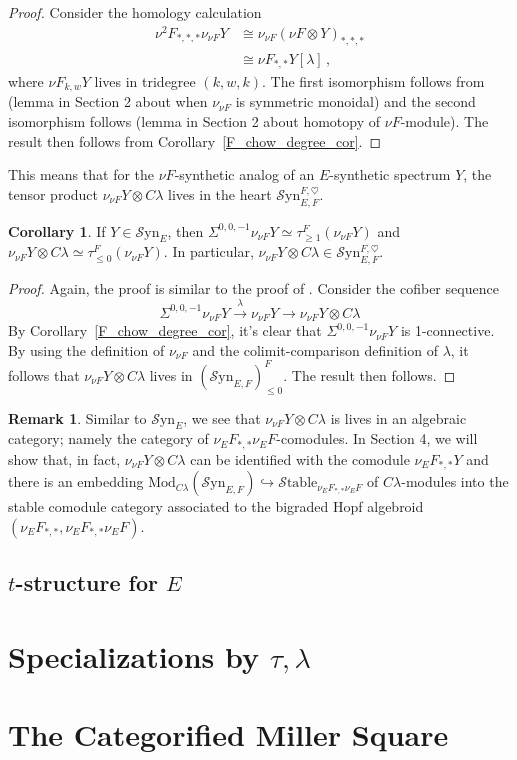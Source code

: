 \documentclass[10pt]{amsart}
\theoremstyle{definition}
\numberwithin{figure}{section}
\numberwithin{equation}{section}
\newtheorem{corollary}[figure]{Corollary}
\newtheorem{remark}[figure]{Remark}
\theoremstyle{cited}
\newcommand{\Mod}{\mathrm{Mod}}
\newcommand{\Syn}{\mathcal{S}\mathrm{yn}}
\newcommand{\Stable}{\mathcal{S}\mathrm{table}}
\begin{document}
\begin{proof}
    Consider the homology calculation
\begin{equation*}
    \begin{aligned}
        \nu^2F_{*,*,*}\nu_{\nu F}Y &\cong \nu_{\nu F}(\nu F\otimes Y)_{*,*,*} \\
        &\cong \nu F_{*,*} Y[\lambda]\, ,
    \end{aligned}
\end{equation*}
where $\nu F_{k,w} Y$ lives in tridegree $(k,w,k)$. The first isomorphism follows from (lemma in Section 2 about when $\nu_{\nu F}$ is symmetric monoidal) and the second isomorphism follows (lemma in Section 2 about homotopy of $\nu F$-module). The result then follows from Corollary~\ref{F_chow_degree_cor}.
\end{proof}

This means that for the $\nu F$-synthetic analog of an $E$-synthetic spectrum $Y$, the tensor product $\nu_{\nu F}Y\otimes C\lambda$ lives in the heart $\Syn_{E,F}^{F,\heartsuit}$.

\begin{corollary}
If $Y\in\Syn_E$, then $\Sigma^{0,0,-1}\nu_{\nu F}Y\simeq \tau_{\geq 1}^F(\nu_{\nu F}Y)$ and $\nu_{\nu F} Y\otimes C\lambda\simeq \tau_{\leq 0}^F(\nu_{\nu F}Y)$. In particular, $\nu_{\nu F}Y\otimes C\lambda\in \Syn_{E,F}^{F,\heartsuit}$.  
\end{corollary}

\begin{proof}
   Again, the proof is similar to the proof of \cite[Lemma 4.29]{Pst22}. Consider the cofiber sequence
   $$
\Sigma^{0,0,-1}\nu_{\nu F}Y\xrightarrow{\lambda}\nu_{\nu F}Y\to \nu_{\nu F}Y\otimes C\lambda
   $$
   By Corollary~\ref{F_chow_degree_cor}, it's clear that $\Sigma^{0,0,-1}\nu_{\nu F}Y$ is 1-connective. By using the definition of $\nu_{\nu F}$ and the colimit-comparison definition of $\lambda$, it follows that $\nu_{\nu F}Y\otimes C\lambda$ lives in $(\Syn_{E,F})_{\leq 0}^F$. The result then follows.
\end{proof}

\begin{remark}
Similar to $\Syn_E$, we see that $\nu_{\nu F}Y\otimes C\lambda$ is lives in an algebraic category; namely the category of $\nu_EF_{*,*}\nu_E F$-comodules. In Section 4, we will show that, in fact, $\nu_{\nu F}Y\otimes C\lambda$ can be identified with the comodule $\nu_{E}F_{*,*}Y$ and there is an embedding $\Mod_{C\lambda}(\Syn_{E,F})\hookrightarrow \Stable_{\nu_EF_{*,*}\nu_EF}$ of $C\lambda$-modules into the stable comodule category associated to the bigraded Hopf algebroid $(\nu_EF_{*,*},\nu_EF_{*,*}\nu_EF)$.    
\end{remark}

\subsection{$t$-structure for $E$}
\label{E_tstruct_subsec}

\section{Specializations by $\tau,\lambda$}

\section{The Categorified Miller Square}
\end{document}
